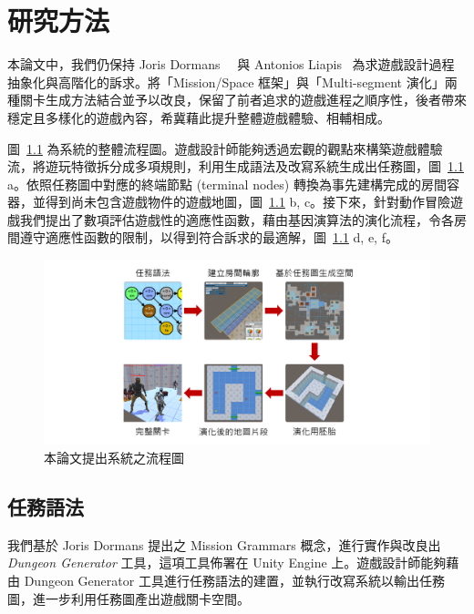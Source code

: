 \chapter{研究方法}
\label{cha:methodology}

本論文中，我們仍保持 Joris Dormans~\cite{dormans2010adventures}~\cite{dormans2012engineering} 與 Antonios Liapis~\cite{liapis2013generating} 為求遊戲設計過程抽象化與高階化的訴求。將「Mission/Space 框架」與「Multi-segment 演化」兩種關卡生成方法結合並予以改良，保留了前者追求的遊戲進程之順序性，後者帶來穩定且多樣化的遊戲內容，希冀藉此提升整體遊戲體驗、相輔相成。

圖~\ref{fig:system-framework} 為系統的整體流程圖。遊戲設計師能夠透過宏觀的觀點來構築遊戲體驗流，將遊玩特徵拆分成多項規則，利用生成語法及改寫系統生成出任務圖，圖~\ref{fig:system-framework} a。依照任務圖中對應的終端節點 (terminal nodes) 轉換為事先建構完成的房間容器，並得到尚未包含遊戲物件的遊戲地圖，圖~\ref{fig:system-framework} b, c。接下來，針對動作冒險遊戲我們提出了數項評估遊戲性的適應性函數，藉由基因演算法的演化流程，令各房間遵守適應性函數的限制，以得到符合訴求的最適解，圖~\ref{fig:system-framework} d, e, f。

\begin{figure}[ht]
  \begin{center}
    \includegraphics[width=1.0\textwidth]{figures/系統框架.png}
    \caption{本論文提出系統之流程圖} 
    \label{fig:system-framework}
  \end{center}
\end{figure}

\section{任務語法}
\label{sec:method-missiongrammars}

我們基於 Joris Dormans 提出之 Mission Grammars 概念，進行實作與改良出 \textit{Dungeon Generator} 工具，這項工具佈署在 Unity Engine 上。遊戲設計師能夠藉由 Dungeon Generator 工具進行任務語法的建置，並執行改寫系統以輸出任務圖，進一步利用任務圖產出遊戲關卡空間。

